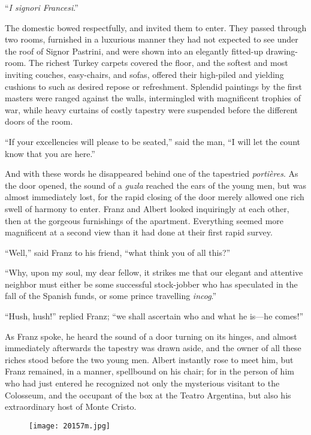 “\textit{I signori Francesi}.”

The domestic bowed respectfully, and invited them to enter. They passed
through two rooms, furnished in a luxurious manner they had not
expected to see under the roof of Signor Pastrini, and were shown into
an elegantly fitted-up drawing-room. The richest Turkey carpets covered
the floor, and the softest and most inviting couches, easy-chairs, and
sofas, offered their high-piled and yielding cushions to such as
desired repose or refreshment. Splendid paintings by the first masters
were ranged against the walls, intermingled with magnificent trophies
of war, while heavy curtains of costly tapestry were suspended before
the different doors of the room.

“If your excellencies will please to be seated,” said the man, “I will
let the count know that you are here.”

And with these words he disappeared behind one of the tapestried
\textit{portières}. As the door opened, the sound of a \textit{guzla} reached the
ears of the young men, but was almost immediately lost, for the rapid
closing of the door merely allowed one rich swell of harmony to enter.
Franz and Albert looked inquiringly at each other, then at the gorgeous
furnishings of the apartment. Everything seemed more magnificent at a
second view than it had done at their first rapid survey.

“Well,” said Franz to his friend, “what think you of all this?”

“Why, upon my soul, my dear fellow, it strikes me that our elegant and
attentive neighbor must either be some successful stock-jobber who has
speculated in the fall of the Spanish funds, or some prince travelling
\textit{incog}.”

“Hush, hush!” replied Franz; “we shall ascertain who and what he is—he
comes!”

As Franz spoke, he heard the sound of a door turning on its hinges, and
almost immediately afterwards the tapestry was drawn aside, and the
owner of all these riches stood before the two young men. Albert
instantly rose to meet him, but Franz remained, in a manner, spellbound
on his chair; for in the person of him who had just entered he
recognized not only the mysterious visitant to the Colosseum, and the
occupant of the box at the Teatro Argentina, but also his extraordinary
host of Monte Cristo.

\begin{figure}[h]
\texttt{[image: 20157m.jpg]}
\end{figure}
